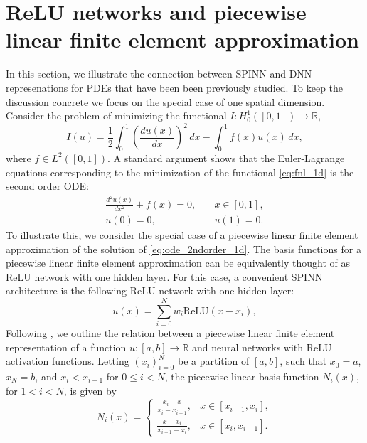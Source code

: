 \documentclass[12pt]{article}
\begin{document}
\section{ReLU networks and piecewise linear finite element approximation} \label{app:relu_fem_1d}
In this section, we illustrate the connection between SPINN and DNN represenations for PDEs that have been been previously studied. To keep the discussion concrete we focus on the special case of one spatial dimension. Consider the problem of minimizing the functional $I:H^1_0([0,1]) \to \mathbb{R}$, 
\begin{equation} \label{eq:fnl_1d}
I(u) = \frac{1}{2}\int_0^1 \left(\frac{du(x)}{dx}\right)^2 \,dx - \int_0^1 f(x)u(x) \,dx,
\end{equation}
where $f \in L^2([0,1])$. A standard argument shows that the Euler-Lagrange equations corresponding to the minimization of the functional \eqref{eq:fnl_1d} is the second order ODE:
\begin{equation} \label{eq:ode_2ndorder_1d}
\begin{split}
\frac{d^2u(x)}{dx^2} + f(x) = 0, & \quad x \in [0,1],\\
u(0) = 0, & \quad u(1) = 0.
\end{split}
\end{equation}
To illustrate this, we consider the special case of a piecewise linear finite element approximation of the solution of \eqref{eq:ode_2ndorder_1d}. The basis functions for a piecewise linear finite element approximation can be equivalently thought of as ReLU network with one hidden layer. For this case, a convenient SPINN architecture is the following ReLU network with one hidden layer: 
\begin{equation} \label{eq:spinn_1d}
u(x) = \sum_{i=0}^N w_i \text{ReLU}(x - x_i),
\end{equation}
Following \cite{HLXZ2020}, we outline the relation between a piecewise linear finite element representation of a function $u:[a,b] \to \mathbb{R}$ and neural networks with ReLU activation functions. Letting $(x_i)_{i=0}^N$ be a partition of $[a,b]$, such that $x_0 = a$, $x_N = b$, and $x_i < x_{i+1}$ for $0 \le i < N$, the piecewise linear basis function $N_i(x)$, for $1 < i < N$, is given by
\begin{equation} \label{eq:hat_function_fem_1d}
N_i(x) = \begin{cases}
\frac{x_i - x}{x_i - x_{i-1}}, & x \in [x_{i-1},x_i],\\
\frac{x - x_i}{x_{i+1} - x_i}, & x \in [x_i, x_{i+1}].
\end{cases}
\end{equation}
\end{document}
